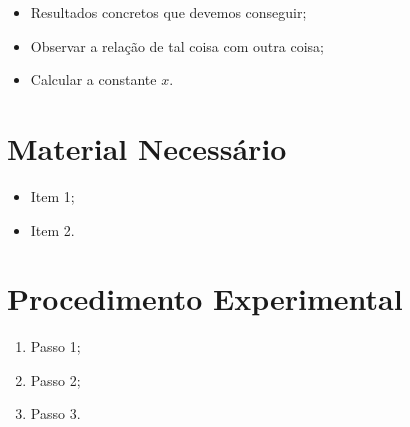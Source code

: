 \begin{itemize}
	\item Resultados concretos que devemos conseguir;
	\item Observar a relação de tal coisa com outra coisa;
	\item Calcular a constante $x$.
\end{itemize}

\section{Material Necessário}

\begin{itemize}
	\item Item 1;
	\item Item 2.
\end{itemize}

\section{Procedimento Experimental}

\begin{enumerate}
	\item Passo 1;
	\item Passo 2;
	\item Passo 3.
\end{enumerate}

\cleardoublepage


\vspace{15mm}

